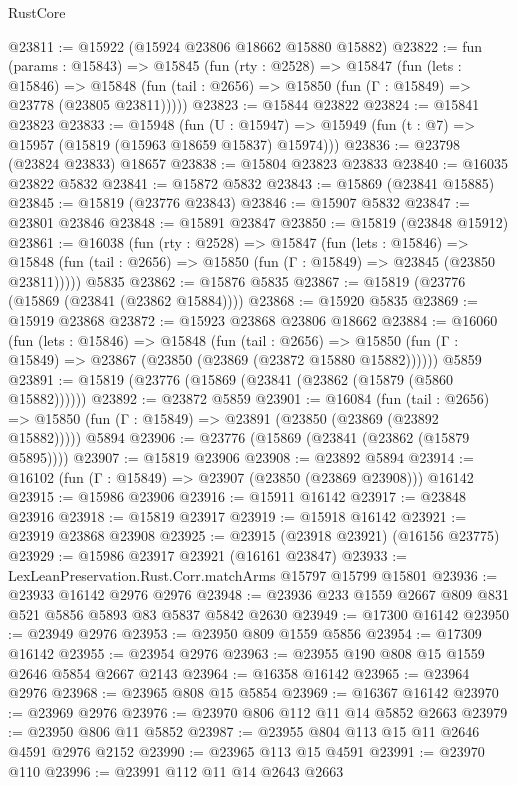 \begin{lexlean}{RustCore}
\begin{coremodule}
@23811 := @15922 (@15924 @23806 @18662 @15880 @15882)
@23822 := fun (params : @15843) =>
  @15845
    (fun (rty : @2528) =>
    @15847
      (fun (lets : @15846) =>
      @15848 (fun (tail : @2656) => @15850 (fun (Γ : @15849) => @23778 (@23805 @23811)))))
@23823 := @15844 @23822
@23824 := @15841 @23823
@23833 := @15948
    (fun (U : @15947) => @15949 (fun (t : @7) => @15957 (@15819 (@15963 @18659 @15837) @15974)))
@23836 := @23798 (@23824 @23833) @18657
@23838 := @15804 @23823 @23833
@23840 := @16035 @23822 @5832
@23841 := @15872 @5832
@23843 := @15869 (@23841 @15885)
@23845 := @15819 (@23776 @23843)
@23846 := @15907 @5832
@23847 := @23801 @23846
@23848 := @15891 @23847
@23850 := @15819 (@23848 @15912)
@23861 := @16038
    (fun (rty : @2528) =>
    @15847
      (fun (lets : @15846) =>
      @15848 (fun (tail : @2656) => @15850 (fun (Γ : @15849) => @23845 (@23850 @23811)))))
    @5835
@23862 := @15876 @5835
@23867 := @15819 (@23776 (@15869 (@23841 (@23862 @15884))))
@23868 := @15920 @5835
@23869 := @15919 @23868
@23872 := @15923 @23868 @23806 @18662
@23884 := @16060
    (fun (lets : @15846) =>
    @15848
      (fun (tail : @2656) =>
      @15850 (fun (Γ : @15849) => @23867 (@23850 (@23869 (@23872 @15880 @15882))))))
    @5859
@23891 := @15819 (@23776 (@15869 (@23841 (@23862 (@15879 (@5860 @15882))))))
@23892 := @23872 @5859
@23901 := @16084
    (fun (tail : @2656) => @15850 (fun (Γ : @15849) => @23891 (@23850 (@23869 (@23892 @15882)))))
    @5894
@23906 := @23776 (@15869 (@23841 (@23862 (@15879 @5895))))
@23907 := @15819 @23906
@23908 := @23892 @5894
@23914 := @16102 (fun (Γ : @15849) => @23907 (@23850 (@23869 @23908))) @16142
@23915 := @15986 @23906
@23916 := @15911 @16142
@23917 := @23848 @23916
@23918 := @15819 @23917
@23919 := @15918 @16142
@23921 := @23919 @23868 @23908
@23925 := @23915 (@23918 @23921) (@16156 @23775)
@23929 := @15986 @23917 @23921 (@16161 @23847)
@23933 := LexLeanPreservation.Rust.Corr.matchArms @15797 @15799 @15801
@23936 := @23933 @16142 @2976 @2976
@23948 := @23936 @233 @1559 @2667 @809 @831 @521 @5856 @5893 @83 @5837 @5842 @2630
@23949 := @17300 @16142
@23950 := @23949 @2976
@23953 := @23950 @809 @1559 @5856
@23954 := @17309 @16142
@23955 := @23954 @2976
@23963 := @23955 @190 @808 @15 @1559 @2646 @5854 @2667 @2143
@23964 := @16358 @16142
@23965 := @23964 @2976
@23968 := @23965 @808 @15 @5854
@23969 := @16367 @16142
@23970 := @23969 @2976
@23976 := @23970 @806 @112 @11 @14 @5852 @2663
@23979 := @23950 @806 @11 @5852
@23987 := @23955 @804 @113 @15 @11 @2646 @4591 @2976 @2152
@23990 := @23965 @113 @15 @4591
@23991 := @23970 @110
@23996 := @23991 @112 @11 @14 @2643 @2663

\end{coremodule}
\end{lexlean}
